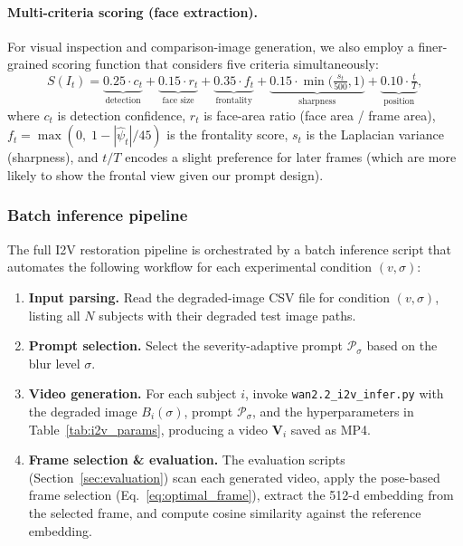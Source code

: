 \paragraph{Multi-criteria scoring (face extraction).}
For visual inspection and comparison-image generation, we also
employ a finer-grained scoring function that considers five
criteria simultaneously:
\begin{equation}
    S(I_t) = \underbrace{0.25 \cdot c_t}_{\text{detection}}
           + \underbrace{0.15 \cdot r_t}_{\text{face size}}
           + \underbrace{0.35 \cdot f_t}_{\text{frontality}}
           + \underbrace{0.15 \cdot \min\!\bigl(\tfrac{s_t}{500}, 1\bigr)}_{\text{sharpness}}
           + \underbrace{0.10 \cdot \tfrac{t}{T}}_{\text{position}},
    \label{eq:multi_score}
\end{equation}
where $c_t$ is detection confidence, $r_t$ is face-area ratio
(face area / frame area), $f_t = \max(0,\; 1 - |\hat{\psi}_t| / 45)$
is the frontality score, $s_t$ is the Laplacian variance
(sharpness), and $t/T$ encodes a slight preference for later
frames (which are more likely to show the frontal view given
our prompt design).

\subsubsection{Batch inference pipeline}
\label{subsubsec:batch_pipeline}

The full I2V restoration pipeline is orchestrated by a batch
inference script that automates the following workflow for each
experimental condition $(v, \sigma)$:

\begin{enumerate}
    \item \textbf{Input parsing.}\;
          Read the degraded-image CSV file for condition
          $(v, \sigma)$, listing all $N$ subjects with their
          degraded test image paths.

    \item \textbf{Prompt selection.}\;
          Select the severity-adaptive prompt $\mathcal{P}_\sigma$
          based on the blur level $\sigma$.

    \item \textbf{Video generation.}\;
          For each subject $i$, invoke
          \texttt{wan2.2\_i2v\_infer.py} with the degraded image
          $B_i(\sigma)$, prompt $\mathcal{P}_\sigma$, and the
          hyperparameters in Table~\ref{tab:i2v_params}, producing
          a video $\mathbf{V}_i$ saved as MP4.

    \item \textbf{Frame selection \& evaluation.}\;
          The evaluation scripts (Section~\ref{sec:evaluation})
          scan each generated video, apply the pose-based frame
          selection (Eq.~\ref{eq:optimal_frame}), extract the
          512-d embedding from the selected frame, and compute
          cosine similarity against the reference embedding.
\end{enumerate}

